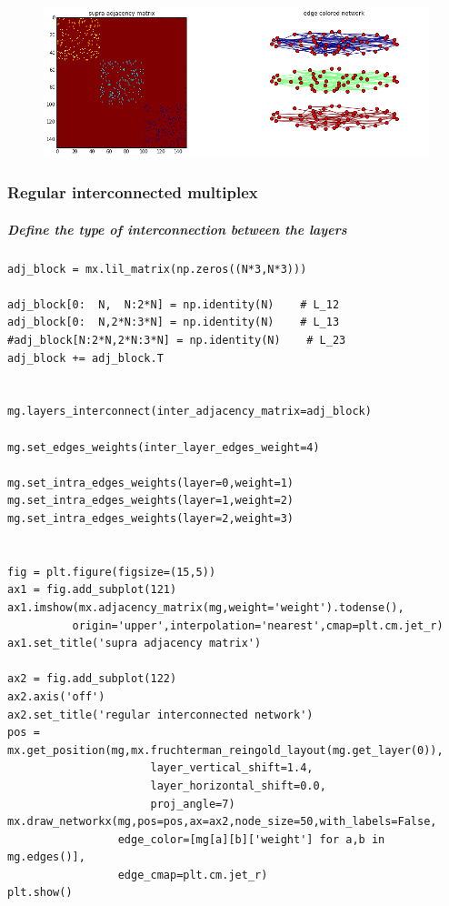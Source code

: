 \documentclass[11pt]{article}
\begin{document}
\begin{figure}[htbp]
\centering
\includegraphics[width=\textwidth]{output_46_0.png}
\end{figure}

\subsubsection{Regular interconnected
multiplex}\label{regular-interconnected-multiplex}

\subparagraph{Define the type of interconnection between the
layers}\label{define-the-type-of-interconnection-between-the-layers}

\begin{verbatim}
adj_block = mx.lil_matrix(np.zeros((N*3,N*3)))

adj_block[0:  N,  N:2*N] = np.identity(N)    # L_12
adj_block[0:  N,2*N:3*N] = np.identity(N)    # L_13
#adj_block[N:2*N,2*N:3*N] = np.identity(N)    # L_23
adj_block += adj_block.T


mg.layers_interconnect(inter_adjacency_matrix=adj_block)

mg.set_edges_weights(inter_layer_edges_weight=4)

mg.set_intra_edges_weights(layer=0,weight=1)
mg.set_intra_edges_weights(layer=1,weight=2)
mg.set_intra_edges_weights(layer=2,weight=3)


fig = plt.figure(figsize=(15,5))
ax1 = fig.add_subplot(121)
ax1.imshow(mx.adjacency_matrix(mg,weight='weight').todense(),
          origin='upper',interpolation='nearest',cmap=plt.cm.jet_r)
ax1.set_title('supra adjacency matrix')

ax2 = fig.add_subplot(122)
ax2.axis('off')
ax2.set_title('regular interconnected network')
pos = mx.get_position(mg,mx.fruchterman_reingold_layout(mg.get_layer(0)),
                      layer_vertical_shift=1.4,
                      layer_horizontal_shift=0.0,
                      proj_angle=7)
mx.draw_networkx(mg,pos=pos,ax=ax2,node_size=50,with_labels=False,
                 edge_color=[mg[a][b]['weight'] for a,b in mg.edges()],
                 edge_cmap=plt.cm.jet_r)
plt.show()
\end{verbatim}
\end{document}
